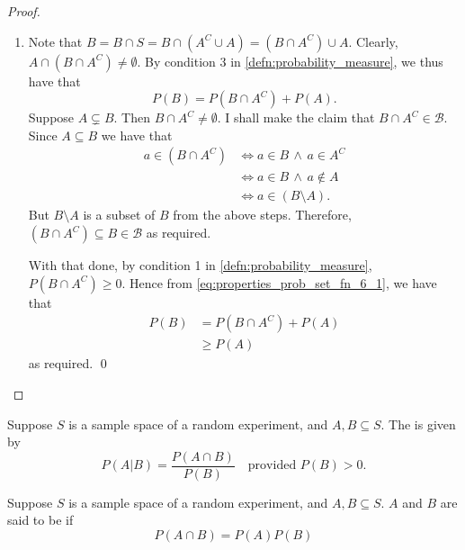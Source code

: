 \documentclass[notoc,notitlepage]{tufte-book}
\begin{document}
\begin{proof}
\begin{enumerate}
    \item Note that $B = B \cap S = B \cap (A^C \cup A) = (B \cap A^C) \cup A$. Clearly, $A \cap (B \cap A^C) \neq \emptyset$. By condition 3 in \cref{defn:probability_measure}, we thus have that
      \begin{equation*}\tag{$\dagger$}\label{eq:properties_prob_set_fn_6_1}
        P(B) = P(B \cap A^C) + P(A).
      \end{equation*}
      Suppose $A \subsetneq B$. Then $B \cap A^C \neq \emptyset$. I shall make the claim that $B \cap A^C \in \mathscr{B}$. Since $A \subseteq B$ we have that
      \begin{align*}
        a \in (B \cap A^C) &\iff a \in B \, \land \, a \in A^C \\
          &\iff a \in B \, \land \, a \notin A \\
          &\iff a \in (B \setminus A).
      \end{align*}
      But $B \setminus A$ is a subset of $B$ from the above steps. Therefore, $(B \cap A^C) \subseteq B \in \mathscr{B}$ as required.

      With that done, by condition 1 in \cref{defn:probability_measure}, $P(B \cap A^C) \geq 0$. Hence from \cref{eq:properties_prob_set_fn_6_1}, we have that
      \begin{align*}
        P(B) &= P(B \cap A^C) + P(A) \\
          &\geq P(A)
      \end{align*}
      as required. \qed
  \end{enumerate}
\end{proof}
\begin{defn}\label{defn:conditional_probability}
  Suppose $S$ is a sample space of a random experiment, and $A, B \subseteq S$. The  is given by
  \begin{equation}\label{eq:conditional_probability}
    P(A | B) = \frac{P(A \cap B)}{P(B)} \quad \text{provided } P(B) > 0.
  \end{equation}
\end{defn}

\begin{defn}\label{defn:independent_events}
  Suppose $S$ is a sample space of a random experiment, and $A, B \subseteq S$. $A$ and $B$ are said to be  if
  \begin{equation*}
    P(A \cap B) = P(A) P(B)
  \end{equation*}
\end{defn}
\end{document}
